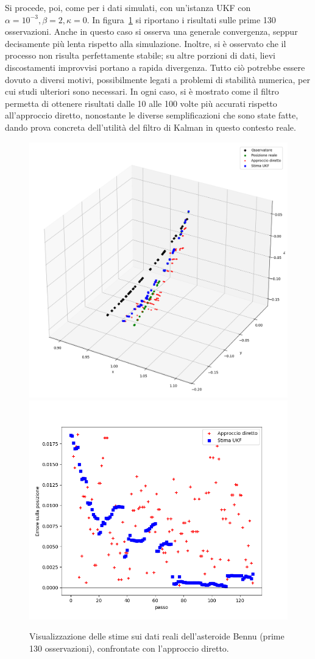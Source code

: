 \documentclass[12pt,a4paper,openright,twoside]{book}
\begin{document}
Si procede, poi, come per i dati simulati, con un'istanza UKF con $\alpha=10^{-3},\beta=2,\kappa=0$. In figura~\ref{fig:Bennu130} si riportano i risultati sulle prime 130 osservazioni. Anche in questo caso si osserva una generale convergenza, seppur decisamente più lenta rispetto alla simulazione. Inoltre, si è osservato che il processo non risulta perfettamente stabile; su altre porzioni di dati, lievi discostamenti improvvisi portano a rapida divergenza. Tutto ciò potrebbe essere dovuto a diversi motivi, possibilmente legati a problemi di stabilità numerica, per cui studi ulteriori sono necessari. In ogni caso, si è mostrato come il filtro permetta di ottenere risultati dalle 10 alle 100 volte più accurati rispetto all'approccio diretto, nonostante le diverse semplificazioni che sono state fatte, dando prova concreta dell'utilità del filtro di Kalman in questo contesto reale.

\begin{figure}
    \includegraphics[width=0.55\linewidth]{figures/Bennu_130_3d.png}
    \includegraphics[width=0.45\linewidth]{figures/Bennu_130_error.png}
    \caption{Visualizzazione delle stime sui dati reali dell'asteroide Bennu (prime 130 osservazioni), confrontate con l'approccio diretto.}
    \label{fig:Bennu130}
    \vspace{2\baselineskip}
\end{figure}
\end{document}
